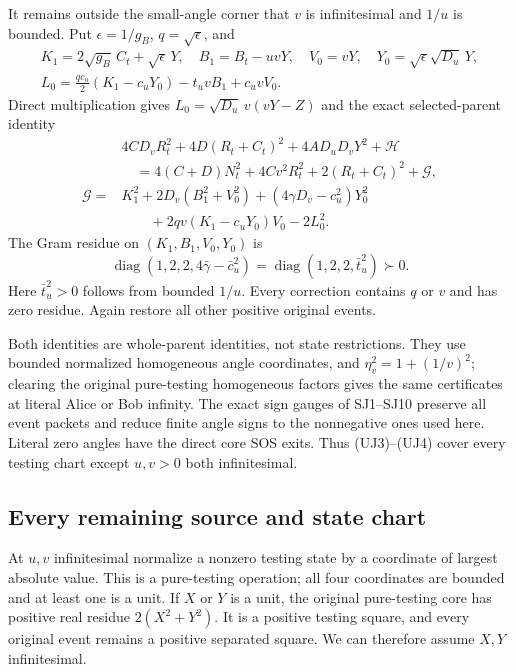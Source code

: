 It remains outside the small-angle corner that $v$ is infinitesimal
and $1/u$ is bounded. Put $\epsilon=1/g_B$, $q=\sqrt\epsilon$, and
\[
\begin{gathered}
 K_1=2\sqrt{g_B}\,C_t+\sqrt\epsilon\,Y,\quad
 B_1=B_t-uvY,\quad V_0=vY,\quad
 Y_0=\sqrt\epsilon\sqrt{D_u}\,Y,\\
 L_0=\frac{qc_u}{2}(K_1-c_uY_0)-t_uvB_1+c_uvV_0.
\end{gathered}
\]
Direct multiplication gives
$L_0=\sqrt{D_u}\,v(vY-Z)$ and the exact selected-parent identity
\[
\begin{split}
 &4CD_vR_t^2+4D(R_t+C_t)^2+4AD_uD_vY^2+\mathcal H\\
 &\quad=4(C+D)N_t^2+4Cv^2R_t^2+2(R_t+C_t)^2+\mathcal G,\\
 \mathcal G={}&K_1^2+2D_v(B_1^2+V_0^2)
 +(4\gamma D_v-c_u^2)Y_0^2\\
 &\qquad+2qv(K_1-c_uY_0)V_0-2L_0^2.
\end{split}                                                     \tag{UJ4}
\]
The Gram residue on $(K_1,B_1,V_0,Y_0)$ is
\[
        \operatorname{diag}(1,2,2,4\bar\gamma-\bar c_u^2)
        =\operatorname{diag}(1,2,2,\bar t_u^2)\succ0.
\]
Here $\bar t_u^2>0$ follows from bounded $1/u$. Every correction
contains $q$ or $v$ and has zero residue. Again restore all other
positive original events.

Both identities are whole-parent identities, not state
restrictions. They use bounded normalized homogeneous angle
coordinates, and $\eta_v^2=1+(1/v)^2$; clearing the original
pure-testing homogeneous factors gives the same certificates
at literal Alice or Bob infinity. The exact sign gauges of
SJ1--SJ10 preserve all event packets and reduce finite angle
signs to the nonnegative ones used here. Literal zero angles
have the direct core SOS exits. Thus (UJ3)--(UJ4) cover every
testing chart except $u,v>0$ both infinitesimal.

\subsection{Every remaining source and state chart}

At $u,v$ infinitesimal normalize a nonzero testing state by a
coordinate of largest absolute value. This is a pure-testing
operation; all four coordinates are bounded and at least one
is a unit. If $X$ or $Y$ is a unit, the original pure-testing
core has positive real residue $2(X^2+Y^2)$. It is a positive
testing square, and every original event remains a positive
separated square. We can therefore assume $X,Y$ infinitesimal.

